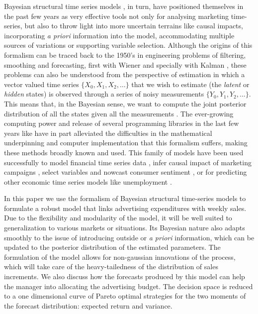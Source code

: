Bayesian structural time series models \cite{scott2014predicting}, in turn, have positioned themselves in the past few years as very effective tools  not only for analysing marketing time-series, but also to throw light into more uncertain terrains like  causal impacts, incorporating \emph{a priori} information into the model, accommodating multiple sources of variations or supporting variable selection. Although the origins of this formalism can be traced back to the 1950's in engineering problems of filtering, smoothing and forecasting, first with Wiener \cite{wiener1949extrapolation} and specially with Kalman \cite{kalman1960new}, these problems can also be understood from the perspective of estimation in which a vector valued time series $\{ X_0, X_1, X_2, \ldots\}$ that we wish to estimate (the \emph{latent} or \emph{hidden} states) is observed through a series of noisy measurements $\{ Y_0, Y_1, Y_2, \ldots\}$. This  means that, in the Bayesian sense, we want to compute the joint posterior distribution of all the states given all the measurements \cite{sarkka2013bayesian}. The ever-growing computing power and release of several programming libraries  in the last few years like \cite{petris2010r, scott2016bsts} have in part alleviated the difficulties in the mathematical underpinning and computer implementation  that this formalism suffers, making these methods broadly known and used. This family of models have been used successfully to model financial time series data \cite{doi:10.1002/asmb.428}, infer causal impact of marketing campaigns \cite{brodersen2015inferring}, select variables and nowcast consumer sentiment  \cite{scott2015bayesian}, or for predicting other economic time series models like unemployment \cite{scott2014predicting}.

In this paper we use the formalism of Bayesian structural time-series models to formulate a robust model that links advertising expenditures with weekly sales. Due to the flexibility and modularity of the model, it will be well suited to generalization to various markets or situations. Its Bayesian nature also adapts smoothly to the issue of introducing outside or \emph{a priori} information, which can be updated to the posterior distribution of the estimated parameters. The formulation of the model allows for non-gaussian innovations of the process, which will take care of the heavy-tailedness of the distribution of sales increments. We also discuss how the forecasts produced by this model can help the manager into allocating the advertising budget. The decision space is reduced to a one dimensional curve of Pareto optimal strategies for the two moments of the forecast distribution: expected return and variance.

